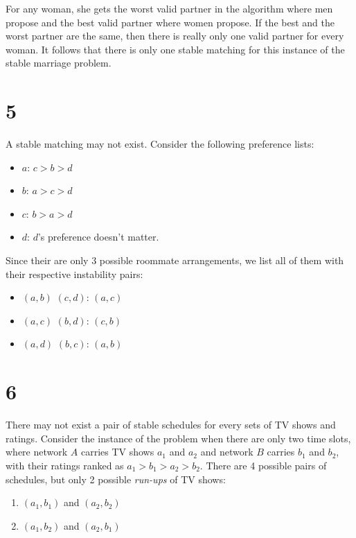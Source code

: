 \documentclass{article}
\begin{document}
For any woman, she gets the worst valid partner in the algorithm where men propose and the best valid partner where women propose. If the best and the worst partner are the same, then there is really only one valid partner for every woman. It follows that there is only one stable matching for this instance of the stable marriage problem.

\section*{5}

A stable matching may not exist. Consider the following preference lists:

\begin{itemize}
	\item $a$: $c > b > d$
	\item $b$: $a > c > d$
	\item $c$: $b > a > d$
	\item $d$: $d$'s preference doesn't matter.
\end{itemize}

Since their are only 3 possible roommate arrangements, we list all of them with their respective instability pairs:

\begin{itemize}
	\item $(a, b)$ $(c, d)$: $(a, c)$
	\item $(a, c)$ $(b, d)$: $(c, b)$
	\item $(a, d)$ $(b, c)$: $(a, b)$
\end{itemize}

\section*{6}

There may not exist a pair of stable schedules for every sets of TV shows and ratings. Consider the instance of the problem when there are only two time slots, where network $A$ carries TV shows $a_1$ and $a_2$ and network $B$ carries $b_1$ and $b_2$, with their ratings ranked as $a_1 > b_1 > a_2 > b_2$. There are 4 possible pairs of schedules, but only 2 possible \emph{run-ups} of TV shows:

\begin{enumerate}
	\item $(a_1, b_1)$ and $(a_2, b_2)$
	\item $(a_1, b_2)$ and $(a_2, b_1)$
\end{enumerate}
\end{document}

